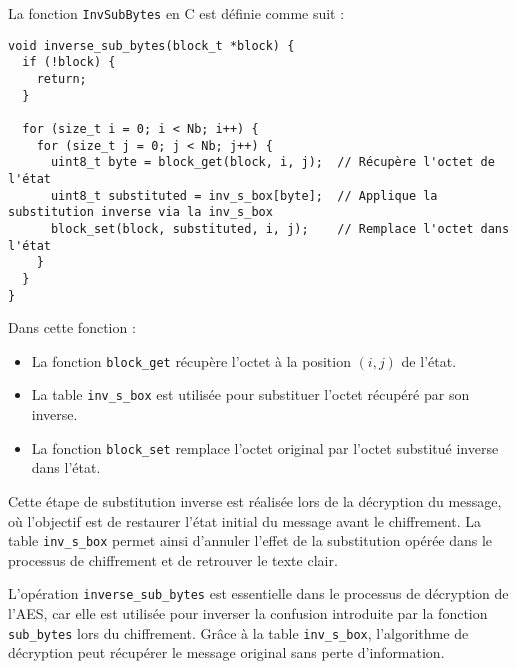 \documentclass[a4paper, 10pt]{article}
\begin{document}
La fonction \texttt{InvSubBytes} en C est définie comme suit :
\small{
\begin{verbatim}
void inverse_sub_bytes(block_t *block) {
  if (!block) {
    return;
  }

  for (size_t i = 0; i < Nb; i++) {
    for (size_t j = 0; j < Nb; j++) {
      uint8_t byte = block_get(block, i, j);  // Récupère l'octet de l'état
      uint8_t substituted = inv_s_box[byte];  // Applique la substitution inverse via la inv_s_box
      block_set(block, substituted, i, j);    // Remplace l'octet dans l'état
    }
  }
}
\end{verbatim}
}
Dans cette fonction :
\begin{itemize}
  \item La fonction \texttt{block\_get} récupère l'octet à la position \( (i,j) \) de l'état.
  \item La table \texttt{inv\_s\_box} est utilisée pour substituer l'octet récupéré par son inverse.
  \item La fonction \texttt{block\_set} remplace l'octet original par l'octet substitué inverse dans l'état.
\end{itemize}
Cette étape de substitution inverse est réalisée lors de la décryption du message, où l'objectif est de restaurer l'état initial du message avant le chiffrement. La table \texttt{inv\_s\_box} permet ainsi d'annuler l'effet de la substitution opérée dans le processus de chiffrement et de retrouver le texte clair.

L'opération \texttt{inverse\_sub\_bytes} est essentielle dans le processus de décryption de l'AES, car elle est utilisée pour inverser la confusion introduite par la fonction \texttt{sub\_bytes} lors du chiffrement. Grâce à la table \texttt{inv\_s\_box}, l'algorithme de décryption peut récupérer le message original sans perte d'information.
  
\end{document}
